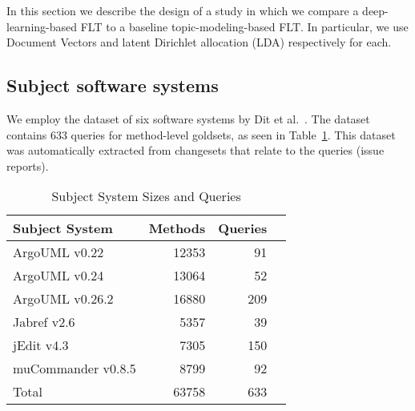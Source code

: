 
%


%


In this section we describe the design of a study in which we compare
a deep-learning-based FLT to a baseline topic-modeling-based FLT.  In
particular, we use Document Vectors and latent Dirichlet allocation (LDA)
respectively for each.


\subsection{Subject software systems}

We employ the dataset of six software systems by Dit et
al.~\cite{Dit-etal_2013}.  The dataset contains 633 queries for method-level
goldsets, as seen in Table~\ref{table:subjects}.  This dataset was automatically
extracted from changesets that relate to the queries (issue reports).

\begin{table}[t]
\renewcommand{\arraystretch}{1.3}
\footnotesize
\centering
\caption{Subject System Sizes and Queries}
\begin{tabular}{lrrr}
    \toprule
    Subject System     & Methods & Queries    \\    %
    \midrule                                        %
    ArgoUML v0.22      & 12353    & 91        \\    %
    ArgoUML v0.24      & 13064    & 52        \\    %
    ArgoUML v0.26.2    & 16880    & 209       \\    %
    Jabref v2.6        & 5357     & 39        \\    %
    jEdit v4.3         & 7305     & 150       \\    %
    muCommander v0.8.5 & 8799     & 92        \\    %
    \midrule                                        %
    Total              & 63758    & 633       \\    %
    \bottomrule
\end{tabular}
\label{table:subjects}
\end{table}

